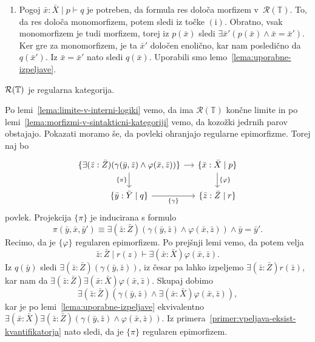 \documentclass[../kategoricna_logika.tex]{subfiles}
\begin{document}
\begin{dokaz}
\begin{enumerate}[label=(\roman*)]
  \item Pogoj $\bar{x}:\bar{X} \mid p \vdash q$
    je potreben, da formula res določa morfizem
    v~$\mathcal{R}(\mathbb{T})$.  To, da res določa monomorfizem,
    potem sledi iz točke $(\mathrm{i})$. Obratno, vsak monomorfizem je
    tudi morfizem, torej iz $p(\bar{x})$ sledi $\exists \bar{x}'( p(\bar{x}) \land
    \bar{x}=\bar{x}')$. Ker gre za monomorfizem, je ta $\bar{x}'$ določen enolično, kar
    nam posledično da $q(\bar{x}')$. Iz $\bar{x} = \bar{x}'$ nato sledi
    $q(\bar{x})$. Uporabili smo lemo~\ref{lema:uporabne-izpeljave}.\qedhere
  \end{enumerate}
\end{dokaz}
\begin{trditev}
  $\mathcal{R}(\mathbb{T})$ je regularna kategorija.
\end{trditev}
\begin{dokaz}
  Po lemi~\ref{lema:limite-v-interni-logiki} vemo, da ima
  $\mathcal{R}(\mathbb{T})$ končne limite in po lemi~\ref{lema:morfizmi-v-sintakticni-kategoriji} vemo,
  da kozožki
  jedrnih parov obstajajo. Pokazati moramo še, da povleki ohranjajo
  regularne epimorfizme.  Torej naj bo
  \begin{equation*}
    \begin{tikzcd}[column sep=small]
      \{\exists (\bar{z}:\bar{Z})(\gamma(\bar{y},\bar{z}) \land \varphi(\bar{x},\bar{z}))\} \ar[d, "{\{ \pi\}}"'] \ar[r] &
      \{ \bar{x}:\bar{X} \mid p\} \ar[d, "{\{\varphi\}}"] \\
      \{\bar{y}:\bar{Y} \mid q\} \ar[r, "{\{\gamma\}}"'] & \{\bar{z}:\bar{Z} \mid r\}
    \end{tikzcd}
  \end{equation*}
  povlek. Projekcija $\{ \pi\}$
  je inducirana s formulo
  \[ \pi(\bar{y},\bar{x},\bar{y}') \equiv \exists (\bar{z}:\bar{Z})(\gamma(\bar{y},\bar{z}) \land \varphi(\bar{x},\bar{z}))\land \bar{y}=\bar{y}'.\]
  Recimo, da je $\{\varphi\}$ regularen
  epimorfizem. Po prejšnji lemi vemo, da potem velja
  $$\bar{z}:\bar{Z} \mid r(z) \vdash \exists (\bar{x}:\bar{X} ) \varphi(\bar{x},\bar{z}).$$
  Iz
  $q(\bar{y})$ sledi $\exists (\bar{z}:\bar{Z})(\gamma(\bar{y},\bar{z}))$, iz česar pa lahko izpeljemo
  $\exists (\bar{z}:\bar{Z}) r(\bar{z})$, kar nam da $\exists (\bar{z}:\bar{Z}) \exists (\bar{x}:\bar{X} )
  \varphi(\bar{x},\bar{z})$. Skupaj dobimo
  \[ \exists (\bar{z}:\bar{Z})(\gamma(\bar{y},\bar{z}) \land \exists (\bar{x}:\bar{X} ) \varphi(\bar{x},\bar{z})),\]
  kar je po lemi~\ref{lema:uporabne-izpeljave} ekvivalentno
  $\exists (\bar{x}:\bar{X} ) \exists (\bar{z}:\bar{Z})(\gamma(\bar{y},\bar{z}) \land \varphi(\bar{x},\bar{z}))$.
  Iz primera~\ref{primer:vpeljava-eksist-kvantifikatorja} nato sledi, da je
  $\{\pi\}$ regularen epimorfizem.
\end{dokaz}
\end{document}

